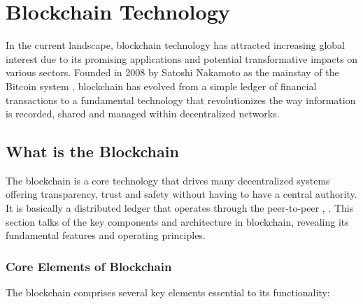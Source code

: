 \chapter{Blockchain Technology} \label{ch:blockchain}

In the current landscape, blockchain technology has attracted increasing global interest due to its promising applications and potential transformative impacts on various 
sectors. Founded in 2008 by Satoshi Nakamoto as the mainstay of the Bitcoin system \cite{9752154}, blockchain has evolved from a simple ledger of financial transactions 
to a fundamental technology that revolutionizes the way information is recorded, shared and managed within decentralized networks.

\section{What is the Blockchain}

The blockchain is a core technology that drives many decentralized systems offering transparency, trust and safety without having to have a central authority. It is 
basically a distributed ledger that operates through the peer-to-peer \cite{9596538}, \cite{ibm_blockchain}. This section talks of the key components and architecture in 
blockchain, revealing its fundamental features and operating principles.

\subsection{Core Elements of Blockchain}

The blockchain comprises several key elements essential to its functionality:

